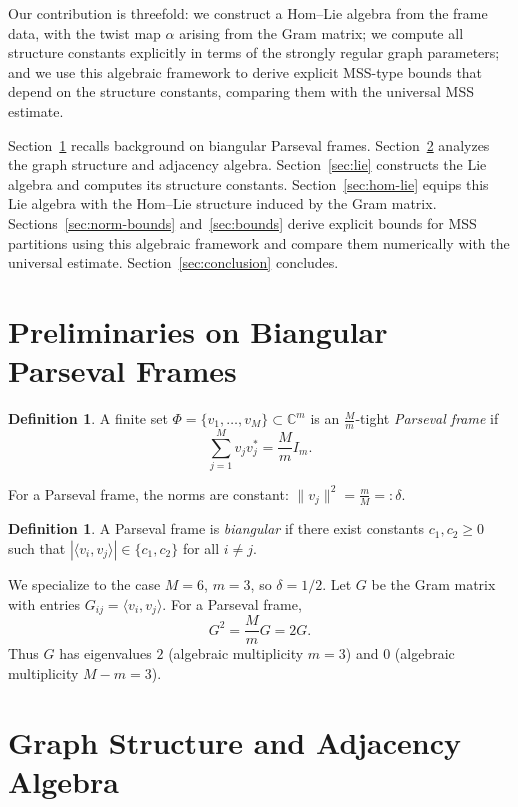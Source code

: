 \documentclass[a4paper]{amsart}
\theoremstyle{plain}
\theoremstyle{definition}
\newtheorem{definition}[theorem]{Definition}
\theoremstyle{remark}
\newcommand{\C}{\mathbb{C}}                    %
\begin{document}
	Our contribution is threefold: we construct a Hom--Lie algebra from the frame data, with the twist map $\alpha$ arising from the Gram matrix; we compute all structure constants explicitly in terms of the strongly regular graph parameters; and we use this algebraic framework to derive explicit MSS-type bounds that depend on the structure constants, comparing them with the universal MSS estimate.
	
	Section~\ref{sec:preliminaries} recalls background on biangular Parseval frames. Section~\ref{sec:graph} analyzes the graph structure and adjacency algebra. Section~\ref{sec:lie} constructs the Lie algebra and computes its structure constants. Section~\ref{sec:hom-lie} equips this Lie algebra with the Hom--Lie structure induced by the Gram matrix. Sections~\ref{sec:norm-bounds} and~\ref{sec:bounds} derive explicit bounds for MSS partitions using this algebraic framework and compare them numerically with the universal estimate. Section~\ref{sec:conclusion} concludes.
	
	\section{Preliminaries on Biangular Parseval Frames}
	\label{sec:preliminaries}
	
	\begin{definition}
		A finite set $\Phi=\{v_1,\dots,v_M\}\subset \C^m$ is an $\frac{M}{m}$-tight {\em Parseval frame} if
		\[
		\sum_{j=1}^M v_jv_j^* = \frac{M}{m}I_m.
		\]
	\end{definition}
	For a Parseval frame, the norms are constant: $\|v_j\|^2 = \frac{m}{M} =: \delta$.
	
	\begin{definition}
		A Parseval frame is {\em biangular} if there exist constants $c_1,c_2\ge 0$ such that $|\langle v_i,v_j\rangle| \in \{c_1,c_2\}$ for all $i\neq j$.
	\end{definition}
	
	We specialize to the case $M=6$, $m=3$, so $\delta = 1/2$. Let $G$ be the Gram matrix with entries $G_{ij} = \langle v_i,v_j\rangle$. For a Parseval frame,
	\begin{equation}
		G^2 = \frac{M}{m}G = 2G. \label{eq:gram-square}
	\end{equation}
	Thus $G$ has eigenvalues $2$ (algebraic multiplicity $m=3$) and $0$ (algebraic multiplicity $M-m=3$).
	
	\section{Graph Structure and Adjacency Algebra}
	\label{sec:graph}
	
\end{document}
